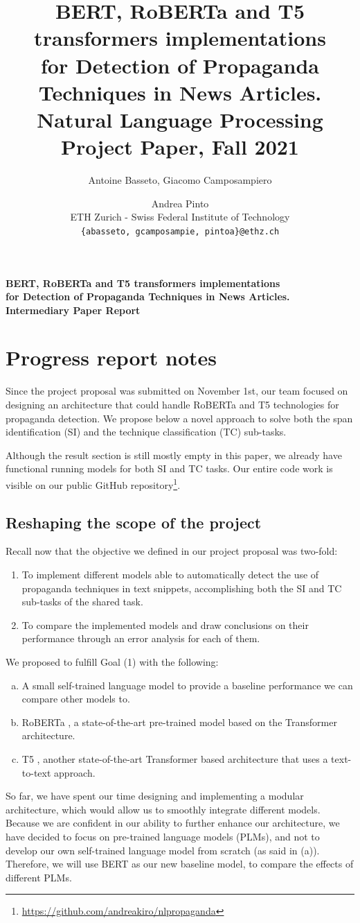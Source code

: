 \documentclass[11pt]{article}
\title{
BERT, RoBERTa and T5 transformers implementations \\ 
for Detection of Propaganda Techniques in News Articles.\\
\vspace{0.2cm}
\small Natural Language Processing Project Paper, Fall 2021
}
\author{
Antoine Basseto,
Giacomo Camposampiero 
\and Andrea Pinto \\         
ETH Zurich - Swiss Federal Institute of Technology \\ 
\texttt{\{abasseto, gcamposampie, pintoa\}@ethz.ch}
}
\newcommand{\pol}[1]{{\fontfamily{pcr}\selectfont#1}}
\begin{document}
\begin{strip}
    \centering
    \textbf{\Large BERT, RoBERTa and T5 transformers implementations \\ 
    for Detection of Propaganda Techniques in News Articles.}\\
    \vspace{0.2cm}
    \textbf{\large Intermediary Paper Report} \normalsize
    \vspace{4mm}
\end{strip}

\section*{Progress report notes}
Since the project proposal was submitted on November 1st, our team focused on designing an architecture that could handle \pol{RoBERTa} and \pol{T5} technologies for propaganda detection. We propose below a novel approach to solve both the span identification (\pol{SI}) and the technique classification (\pol{TC}) sub-tasks.

Although the result section is still mostly empty in this paper, we already have functional running models for both \pol{SI} and \pol{TC} tasks.
Our entire code work is visible on our public GitHub repository\footnote{ \url{https://github.com/andreakiro/nlpropaganda}}.

\subsection*{Reshaping the scope of the project}
Recall now that the objective we defined in our project proposal was two-fold:
\begin{enumerate}
    \item To implement different models able to automatically detect the use of propaganda techniques in text snippets, accomplishing both the \pol{SI} and \pol{TC} sub-tasks of the shared task.
    \item To compare the implemented models and draw conclusions on their performance through an error analysis for each of them.
\end{enumerate}
We proposed to fulfill Goal (1) with the following:
\begin{enumerate}[(a)]
    \item A small self-trained language model to provide a baseline performance we can compare other models to.
    \item \pol{RoBERTa} \cite{roberta}, a state-of-the-art pre-trained model based on the Transformer architecture.
    \item \pol{T5} \cite{2020t5}, another state-of-the-art Transformer based architecture that uses a text-to-text approach.
\end{enumerate}
So far, we have spent our time designing and implementing a modular architecture, which would allow us to smoothly integrate different models.
Because we are confident in our ability to further enhance our architecture, we have decided to focus on pre-trained language models (PLMs), and not to develop our own self-trained language model from scratch (as said in (a)). Therefore, we will use \pol{BERT} as our new baseline model, to compare the effects of different \pol{PLM}s.
\end{document}
